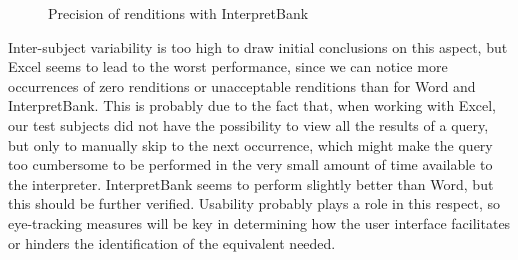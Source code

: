 \documentclass[output=paper]{langsci/langscibook}
\begin{document}
\begin{figure}[p]
\caption{Precision of renditions with InterpretBank \label{fig:prandi:14}}
\end{figure}

Inter-subject variability is too high to draw initial conclusions on this aspect, but Excel seems to lead to the worst performance, since we can notice more occurrences of zero renditions or unacceptable renditions than for Word and InterpretBank. This is probably due to the fact that, when working with Excel, our test subjects did not have the possibility to view all the results of a query, but only to manually skip to the next occurrence, which might make the query too cumbersome to be performed in the very small amount of time available to the interpreter. InterpretBank seems to perform slightly better than Word, but this should be further verified. Usability probably plays a role in this respect, so eye-tracking measures will be key in determining how the user interface facilitates or hinders the identification of the equivalent needed.
\end{document}
